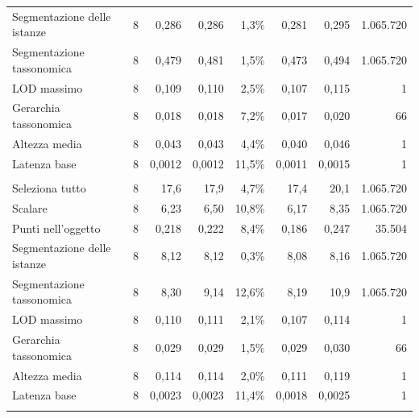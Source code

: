 \begin{small}
\begin{longtable}{lrrrrrr r}
\quad Segmentazione delle istanze & 8 & 0,286 & 0,286 & 1,3\% & 0,281 & 0,295 & 1.065.720 \\
\quad Segmentazione tassonomica & 8 & 0,479 & 0,481 & 1,5\% & 0,473 & 0,494 & 1.065.720 \\
\quad LOD massimo & 8 & 0,109 & 0,110 & 2,5\% & 0,107 & 0,115 & 1 \\
\quad Gerarchia tassonomica & 8 & 0,018 & 0,018 & 7,2\% & 0,017 & 0,020 & 66 \\
\quad Altezza media & 8 & 0,043 & 0,043 & 4,4\% & 0,040 & 0,046 & 1 \\
\quad Latenza base & 8 & 0,0012 & 0,0012 & 11,5\% & 0,0011 & 0,0015 & 1 \\
\addlinespace
\multicolumn{8}{l}{\textbf{Virtuoso}}\\
\quad Seleziona tutto & 8 & 17,6 & 17,9 & 4,7\% & 17,4 & 20,1 & 1.065.720 \\
\quad Scalare & 8 & 6,23 & 6,50 & 10,8\% & 6,17 & 8,35 & 1.065.720 \\
\quad Punti nell'oggetto & 8 & 0,218 & 0,222 & 8,4\% & 0,186 & 0,247 & 35.504 \\
\quad Segmentazione delle istanze & 8 & 8,12 & 8,12 & 0,3\% & 8,08 & 8,16 & 1.065.720 \\
\quad Segmentazione tassonomica & 8 & 8,30 & 9,14 & 12,6\% & 8,19 & 10,9 & 1.065.720 \\
\quad LOD massimo & 8 & 0,110 & 0,111 & 2,1\% & 0,107 & 0,114 & 1 \\
\quad Gerarchia tassonomica & 8 & 0,029 & 0,029 & 1,5\% & 0,029 & 0,030 & 66 \\
\quad Altezza media & 8 & 0,114 & 0,114 & 2,0\% & 0,111 & 0,119 & 1 \\
\quad Latenza base & 8 & 0,0023 & 0,0023 & 11,4\% & 0,0018 & 0,0025 & 1 \\
\addlinespace
\end{longtable}
\end{small}

